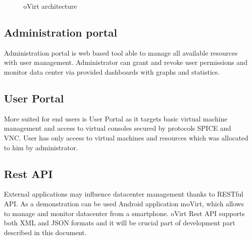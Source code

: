 \begin{figure}[h]
\caption{oVirt architecture \cite{oVirtImg}}
\label{vector}
\end{figure}

\subsection{Administration portal}
Administration portal is web based tool able to manage all available resources with user management. Administrator can grant and revoke user permissions and monitor data center via provided dashboards with graphs and statistics. 

\subsection{User Portal}\label{userportal}
More suited for end users is User Portal as it targets basic virtual machine management and access to virtual consoles secured by protocols SPICE\cite{SPICE} and VNC\cite{VNC}. User has only access to virtual machines and resources which was allocated to him by administrator.

\subsection{Rest API}
External applications may influence datacenter management thanks to RESTful API. As a demonstration can be used Android application moVirt, which allows to manage and monitor datacenter from a smartphone. oVirt Rest API supports both XML and JSON formats and it will be crucial part of development part described in this document.

